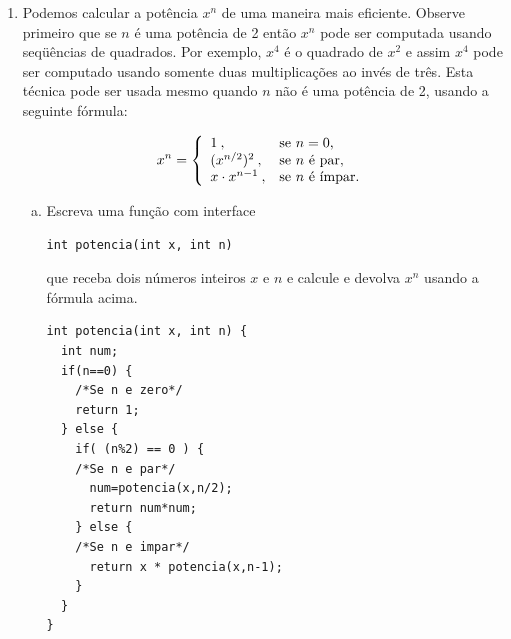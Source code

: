 \documentclass[a4paper,10pt]{article}
\begin{document}
\begin{enumerate}
\begin{lstlisting}
int ciclo(int n){
  int ciclo=1;
  while(n!=1) {
    if(n%2==0) {
      printf("%d ",n/2);
      n=n/2;
    } else {
      printf("%d ",n*3+1);
      n=n*3+1;
    }
    ciclo++;
  }
  return ciclo;
}
int cicloR(int n){
  if(n%2==0) {
    printf("%d ",n/2);
    n=n/2;
  } else {
    printf("%d ",n*3+1);
    n= n*3+1;
  }
  if(n==1) {
    return 2;
  } else {
    return 1+cicloR(n);
  }
}

int main(void)
{
  int x, saida;
  scanf("%d",&x);
  saida=ciclo(x);
  printf("\niterativo %d\n",saida);
  saida=cicloR(x);
  printf("\nrecursivo %d\n",saida);
  return 0;
}
\end{lstlisting}
\pagebreak


\item Podemos calcular a potência $x^n$ de uma maneira mais eficiente.
Observe primeiro que se $n$ é uma potência de 2 então $x^n$ pode ser computada usando seqüências de quadrados.
Por exemplo, $x^4$ é o quadrado de $x^2$ e assim $x^4$ pode ser computado usando somente duas multiplicações 
ao invés de três. Esta técnica pode ser usada mesmo quando $n$ não é uma potência de 2, usando a seguinte fórmula:


\[    x^n = \left \{ \begin{array}{ll}
        1\:, & \textnormal{se $n = 0$,} \\
        (x^{n/2})^2\:, & \textnormal{se $n$ é par,} \\
        x \cdot x^{n-1}\:, & \textnormal{se $n$ é ímpar.}
      \end{array} \right. \]

  
  
  
  
  \begin{enumerate}[(a)]
  \item Escreva uma função com interface

\begin{lstlisting}
int potencia(int x, int n)
\end{lstlisting}

que receba dois números inteiros $x$ e $n$ e calcule e devolva $x^n$ usando a fórmula acima.

\begin{lstlisting}
int potencia(int x, int n) {
  int num;
  if(n==0) {
    /*Se n e zero*/
    return 1;
  } else {
    if( (n%2) == 0 ) {
    /*Se n e par*/
      num=potencia(x,n/2);
      return num*num;
    } else {
    /*Se n e impar*/
      return x * potencia(x,n-1);
    }
  }
}
\end{lstlisting}


\end{enumerate}
\end{enumerate}
\end{document}
